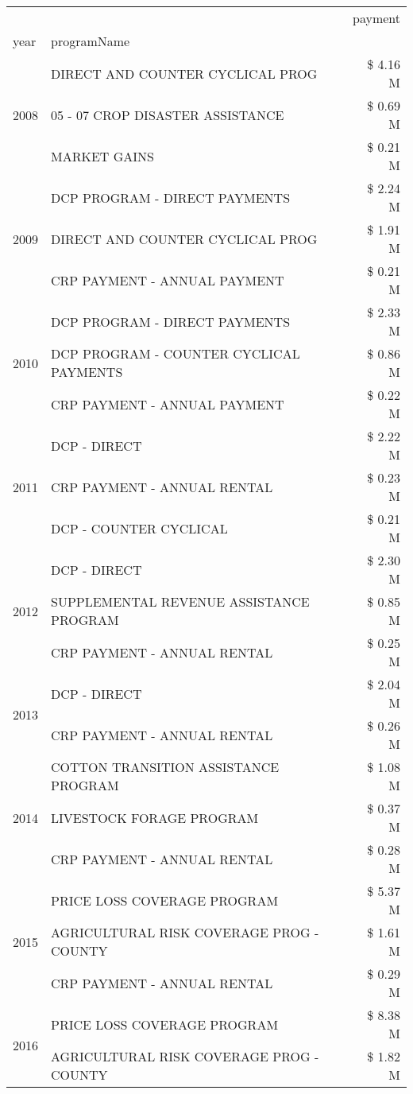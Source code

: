 \begin{tabular}{llr}
\toprule
 &  & payment \\
year & programName &  \\
\midrule
\multirow[t]{3}{*}{2008} & DIRECT AND COUNTER CYCLICAL PROG & \$ 4.16 M \\
 & 05 - 07 CROP DISASTER ASSISTANCE & \$ 0.69 M \\
 & MARKET GAINS & \$ 0.21 M \\
\cline{1-3}
\multirow[t]{3}{*}{2009} & DCP PROGRAM - DIRECT PAYMENTS & \$ 2.24 M \\
 & DIRECT AND COUNTER CYCLICAL PROG & \$ 1.91 M \\
 & CRP PAYMENT - ANNUAL PAYMENT & \$ 0.21 M \\
\cline{1-3}
\multirow[t]{3}{*}{2010} & DCP PROGRAM - DIRECT PAYMENTS & \$ 2.33 M \\
 & DCP PROGRAM - COUNTER CYCLICAL PAYMENTS & \$ 0.86 M \\
 & CRP PAYMENT - ANNUAL PAYMENT & \$ 0.22 M \\
\cline{1-3}
\multirow[t]{3}{*}{2011} & DCP - DIRECT & \$ 2.22 M \\
 & CRP PAYMENT - ANNUAL RENTAL & \$ 0.23 M \\
 & DCP - COUNTER CYCLICAL & \$ 0.21 M \\
\cline{1-3}
\multirow[t]{3}{*}{2012} & DCP - DIRECT & \$ 2.30 M \\
 & SUPPLEMENTAL REVENUE ASSISTANCE PROGRAM & \$ 0.85 M \\
 & CRP PAYMENT - ANNUAL RENTAL & \$ 0.25 M \\
\cline{1-3}
\multirow[t]{2}{*}{2013} & DCP - DIRECT & \$ 2.04 M \\
 & CRP PAYMENT - ANNUAL RENTAL & \$ 0.26 M \\
\cline{1-3}
\multirow[t]{3}{*}{2014} & COTTON TRANSITION ASSISTANCE PROGRAM & \$ 1.08 M \\
 & LIVESTOCK FORAGE PROGRAM & \$ 0.37 M \\
 & CRP PAYMENT - ANNUAL RENTAL & \$ 0.28 M \\
\cline{1-3}
\multirow[t]{3}{*}{2015} & PRICE LOSS COVERAGE PROGRAM & \$ 5.37 M \\
 & AGRICULTURAL RISK COVERAGE PROG - COUNTY & \$ 1.61 M \\
 & CRP PAYMENT - ANNUAL RENTAL & \$ 0.29 M \\
\cline{1-3}
\multirow[t]{3}{*}{2016} & PRICE LOSS COVERAGE PROGRAM                   & \$ 8.38 M \\
 & AGRICULTURAL RISK COVERAGE PROG - COUNTY      & \$ 1.82 M \\

\end{tabular}

